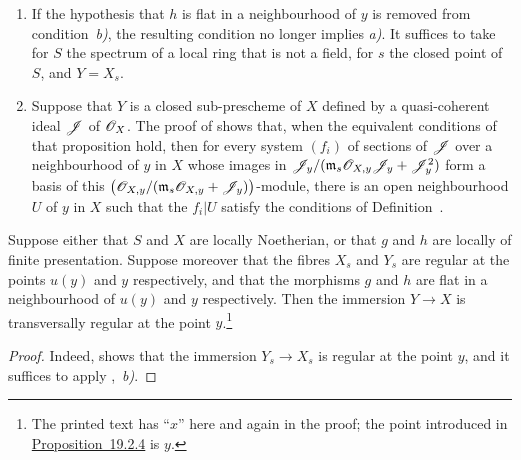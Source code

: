 \begin{remarks}[19.2.5]
\label{IV.19.2.5}
\medskip\noindent
\begin{enumerate}[label=(\roman*)]
  \item If the hypothesis that $h$ is flat in a neighbourhood of $y$ is removed from condition~\emph{b)}, the resulting condition no longer implies \emph{a)}.
It suffices to take for $S$ the spectrum of a local ring that is not a field, for $s$ the closed point of $S$, and $Y=X_s$.
  \item Suppose that $Y$ is a closed sub-prescheme of $X$ defined by a quasi-coherent ideal $\mathscr{J}$ of $\mathscr{O}_X$.
The proof of  shows that, when the equivalent conditions of that proposition hold, then for every system $(f_i)$ of sections of $\mathscr{J}$ over a neighbourhood of $y$ in $X$ whose images in $\mathscr{J}_y/(\mathfrak{m}_s\mathscr{O}_{X,y}\mathscr{J}_y+\mathscr{J}_y^2)$ form a basis of this $\bigl(\mathscr{O}_{X,y}/(\mathfrak{m}_s\mathscr{O}_{X,y}+\mathscr{J}_y)\bigr)$-module, there is an open neighbourhood $U$ of $y$ in $X$ such that the $f_i|U$ satisfy the conditions of Definition~.
\end{enumerate}
\end{remarks}

\begin{corollary}[19.2.6]
\label{IV.19.2.6}
Suppose \textup{either} that $S$ and $X$ are locally Noetherian, \textup{or} that $g$ and $h$ are locally of finite presentation.
Suppose moreover that the fibres $X_s$ and $Y_s$ are regular at the points $u(y)$ and $y$ respectively, and that the morphisms $g$ and $h$ are flat in a neighbourhood of $u(y)$ and $y$ respectively.
Then the immersion $Y\to X$ is transversally regular at the point $y$.\footnote{The printed text has ``$x$'' here and again in the proof; the point introduced in {\hyperref[IV.19.2.4]{Proposition~19.2.4}} is $y$.}
\end{corollary}

\begin{proof}
Indeed,  shows that the immersion $Y_s\to X_s$ is regular at the point $y$, and it suffices to apply ,~\emph{b)}.
\end{proof}

